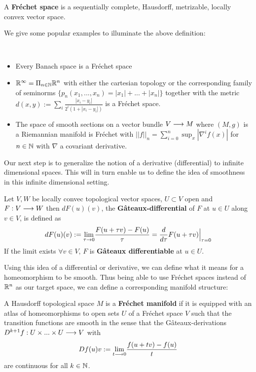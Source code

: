 \begin{definition}
  A \textbf{Fréchet space} is a sequentially complete, Hausdorff, metrizable, locally convex vector space.
\end{definition}

We give some popular examples to illuminate the above definition:

\begin{example}~
\begin{itemize}
  \item Every Banach space is a Fréchet space
  \item $\mathbb{R}^\infty = \Pi_{n\in \mathbb{N}} \mathbb{R}^n$ with either the cartesian topology or the corresponding family of seminorms $\{p_n(x_1,...,x_n) = |x_1| + ... + |x_n| \}$ together with the metric $d(x,y) := \sum_i \frac{|x_i - y_i|}{2^i (1+|x_i - y_i|)}$ is a Fréchet space.
  \item The space of smooth sections on a vector bundle $V \longrightarrow M$ where $(M,g)$ is a Riemannian manifold is Fréchet with $||f||_n = \sum_{i=0}^n \sup_x |\nabla^i f(x)|$ for $n\in \mathbb{N}$ with $\nabla$ a covariant derivative.
\end{itemize}
\end{example}

Our next step is to generalize the notion of a derivative (differential) to infinite dimensional spaces. This will in turn enable us to define the idea of smoothness in this infinite dimensional setting.

\begin{definition}
  Let $V,W$ be locally convec topological vector spaces, $U\subset V$ open and $F:V \longrightarrow W$ then $dF(u)(v)$, the \textbf{Gâteaux-differential} of $F$ at $u\in U$ along $v\in V$, is defined as
  $$dF(u)(v) := \underset{\tau \rightarrow 0}{\lim} \frac{F(u+\tau v) - F(u)}{\tau} = \frac{d }{d \tau} F(u+\tau v) \Big|_{\tau = 0}$$
  If the limit exists $\forall v \in V$, $F$ is \textbf{Gâteaux differentiable} at $u \in U$.
\end{definition}

Using this idea of a differential or derivative, we can define what it means for a homeomorphism to be smooth. Thus being able to use Fréchet spaces instead of $\mathbb{R}^n$ as our target space, we can define a corresponding manifold structure:

\begin{definition}
\label{def:Frechet_manifolds}
  A Hausdorff topological space $M$ is a \textbf{Fréchet manifold} if it is equipped with an atlas of homeomorphisms to open sets $U$ of a Fréchet space $V$ such that the transition functions are smooth in the sense that the Gâteaux-derivations $D^{k+1}f:U \times ... \times U \longrightarrow V$ with
  $$ Df(u)v := \underset{t \longrightarrow 0}{\lim} \frac{f(u+tv)-f(u)}{t} $$
  are continuous for all $k\in \mathbb{N}$.
\end{definition}

